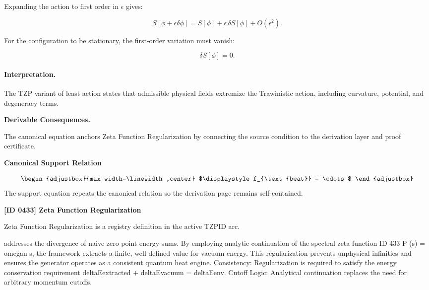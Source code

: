 Expanding the action to first order in $\epsilon$ gives:

\begin{equation}
S[\phi+\epsilon\delta\phi]
=
S[\phi]
+
\epsilon\,\delta S[\phi]
+
O(\epsilon^2).
\end{equation}

For the configuration to be stationary, the first-order variation must vanish:

\begin{equation}
\boxed{
\delta S[\phi]=0 .
}
\end{equation}

\paragraph{Interpretation.}
The TZP variant of least action states that admissible physical fields extremize the Trawinistic action, including curvature, potential, and degeneracy terms.

\par\vspace{0.35em}
\noindent\textbf{Derivable Consequences.}\quad
\begingroup
\footnotesize
\raggedright
The canonical equation anchors Zeta Function Regularization by connecting the source condition to the derivation layer and proof certificate.
\par\endgroup

\noindent\textbf{Canonical Support Relation}\par
\[
\begin{adjustbox}{max width=\linewidth,center}
$\displaystyle
f_{\text{beat}} = \cdots
$
\end{adjustbox}
\]
\noindent The support equation repeats the canonical relation so the derivation page remains self-contained.\par

\clearpage
\noindent\textbf{[ID 0433] Zeta Function Regularization}\par
\vspace{0.35em}
\begingroup\small
{}
Zeta Function Regularization is a registry definition in the active TZPID arc.

addresses the divergence of naive zero point energy sums. By employing analytic continuation of the spectral zeta function ID 433 P (s) = omegan s, the framework extracts a finite, well defined value for vacuum energy. This regularization prevents unphysical infinities and ensures the generator operates as a consistent quantum heat engine. Consistency: Regularization is required to satisfy the energy conservation requirement deltaEextracted + deltaEvacuum = deltaEenv. Cutoff Logic: Analytical continuation replaces the need for arbitrary momentum cutoffs.

